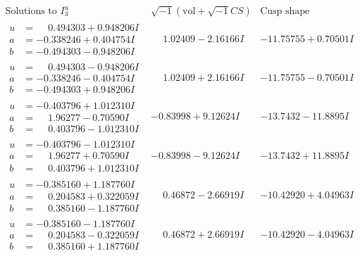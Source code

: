 \documentclass[1p]{elsarticle_modified}
\theoremstyle{definition}
\newcommand{\I}{\sqrt{-1}}
\begin{document}
$$\begin{array}{c|c|c}  
\text{Solutions to }I^u_{3}& \I (\text{vol} + \sqrt{-1}CS) & \text{Cusp shape}\\
 \hline 
\begin{aligned}
u &= \phantom{-}0.494303 + 0.948206 I \\
a &= -0.338246 + 0.404754 I \\
b &= -0.494303 - 0.948206 I\end{aligned}
 & \phantom{-}1.02409 - 2.16166 I & -11.75755 + 0.70501 I \\ \hline\begin{aligned}
u &= \phantom{-}0.494303 - 0.948206 I \\
a &= -0.338246 - 0.404754 I \\
b &= -0.494303 + 0.948206 I\end{aligned}
 & \phantom{-}1.02409 + 2.16166 I & -11.75755 - 0.70501 I \\ \hline\begin{aligned}
u &= -0.403796 + 1.012310 I \\
a &= \phantom{-}1.96277 - 0.70590 I \\
b &= \phantom{-}0.403796 - 1.012310 I\end{aligned}
 & -0.83998 + 9.12624 I & -13.7432 - 11.8895 I \\ \hline\begin{aligned}
u &= -0.403796 - 1.012310 I \\
a &= \phantom{-}1.96277 + 0.70590 I \\
b &= \phantom{-}0.403796 + 1.012310 I\end{aligned}
 & -0.83998 - 9.12624 I & -13.7432 + 11.8895 I \\ \hline\begin{aligned}
u &= -0.385160 + 1.187760 I \\
a &= \phantom{-}0.204583 + 0.322059 I \\
b &= \phantom{-}0.385160 - 1.187760 I\end{aligned}
 & \phantom{-}0.46872 - 2.66919 I & -10.42920 + 4.04963 I \\ \hline\begin{aligned}
u &= -0.385160 - 1.187760 I \\
a &= \phantom{-}0.204583 - 0.322059 I \\
b &= \phantom{-}0.385160 + 1.187760 I\end{aligned}
 & \phantom{-}0.46872 + 2.66919 I & -10.42920 - 4.04963 I \\ \hline\begin{aligned}

\end{aligned}
\end{array}$$
\end{document}
